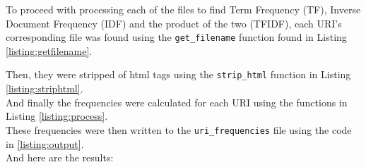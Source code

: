 To proceed with processing each of the files to find Term Frequency (TF), Inverse Document Frequency (IDF) and the product of the two (TFIDF), each URI's corresponding file was found using the {\tt get\_filename} function found in Listing \ref{listing:getfilename}.\\



\newpage

Then, they were stripped of html tags using the {\tt strip\_html} function in Listing \ref{listing:striphtml}.\\



And finally the frequencies were calculated for each URI using the functions in Listing \ref{listing:process}.\\



These frequencies were then written to the {\tt uri\_frequencies} file using the code in \ref{listing:output}.\\



\newpage
And here are the results:\\

